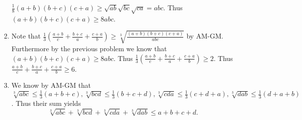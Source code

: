 \documentclass[12pt, letterpaper]{article}
\begin{document}
\begin{enumerate}
\begin{enumerate}
		$\frac{1}{8} (a+b)(b+c)(c+a) \geq \sqrt{ab} \sqrt{bc} \sqrt{ca} = abc$.
		Thus $(a+b)(b+c)(c+a) \geq 8abc$.
		\item Note that $\frac{1}{3}\left(\frac{a+b}{c} + \frac{b+c}{a} + \frac{c+a}{b}\right) \geq \sqrt[3]{\frac{(a+b)(b+c)(c+a)}{abc}}$ by AM-GM.
		Furthermore by the previous problem we know that $(a+b)(b+c)(c+a) \geq 8abc$.	Thus $\frac{1}{3}\left(\frac{a+b}{c} + \frac{b+c}{a} + \frac{c+a}{b}\right) \geq 2$.  Thus  $\frac{a+b}{c} + \frac{b+c}{a} + \frac{c+a}{b} \geq 6$.
		\item We know by AM-GM that $\sqrt[3]{abc} \leq \frac{1}{3}(a+b+c),\sqrt[3]{bcd} \leq \frac{1}{3}(b+c+d),\sqrt[3]{cda} \leq \frac{1}{3}(c+d+a),\sqrt[3]{dab} \leq \frac{1}{3}(d+a+b)$.  Thus their sum yields 
		$$
		\sqrt[3]{abc}+\sqrt[3]{bcd}+\sqrt[3]{cda} + \sqrt[3]{dab} \leq a + b + c+d
		.$$
	\end{enumerate}
\end{enumerate}
\end{document}
